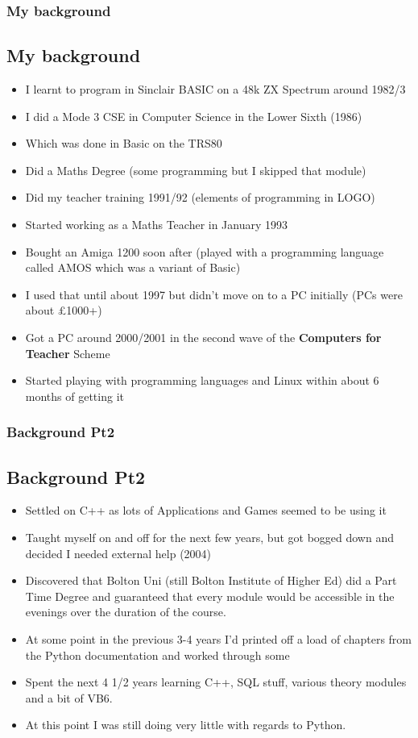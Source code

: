 \documentclass{beamer}
\begin{document}
\begin{frame}
\frametitle{My background}
\subsection{My background}

\begin{itemize}
  \pause
\item I learnt to program in Sinclair BASIC on a 48k ZX Spectrum around 1982/3
  \pause
\item I did a Mode 3 CSE in Computer Science in the Lower Sixth (1986)
  \pause
\item Which was done in Basic on the TRS80
  \pause
\item Did a Maths Degree (some programming but I skipped that module)
\pause
\item Did my teacher training 1991/92 (elements of programming in LOGO)
\pause
\item Started working as a Maths Teacher in January 1993
  \pause
\item Bought an Amiga 1200 soon after (played with a programming language called AMOS which was a variant of Basic) 
  \pause
\item I used that until about 1997 but didn't move on to a PC initially (PCs were about \pounds1000+)
\pause
\item Got a PC around 2000/2001 in the second wave of the \textbf{Computers for Teacher} Scheme
\pause
\item Started playing with programming languages and Linux within about 6 months of getting it
\end{itemize}

\end{frame}

\begin{frame}
\frametitle{Background Pt2}
\subsection{Background Pt2}

\begin{itemize}
\pause
\item Settled on C++ as lots of Applications and Games seemed to be using it
\pause
\item Taught myself on and off for the next few years, but got bogged down and decided I needed external help (2004)
\pause
\item Discovered that Bolton Uni (still Bolton Institute of Higher Ed) did a Part Time Degree and guaranteed that every
  module would be accessible in the evenings over the duration of the course.
\pause
\item At some point in the previous 3-4 years I'd printed off a load of chapters from the Python documentation and
  worked through some
\pause
\item Spent the next 4 1/2 years learning C++, SQL stuff, various theory modules and a bit of VB6.
\pause
\item At this point I was still doing very little with regards to Python.
\end{itemize}
\end{frame}
\end{document}
